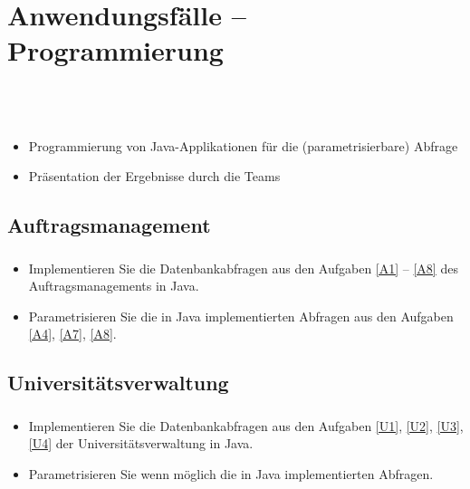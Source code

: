 \section{Anwendungsf\"alle -- Programmierung}

\begin{frame}[t]
\frametitle{\insertsection}
\\[4pt]
\\[8pt]
\begin{itemize}
	\item Programmierung von Java-Applikationen f\"ur die (parametrisierbare) Abfrage
	\item Pr\"asentation der Ergebnisse durch die Teams
\end{itemize}
\end{frame}

\subsection*{Auftragsmanagement}

\begin{frame}[t]
\frametitle{\insertsection}
\framesubtitle{\insertsubsection}
\begin{itemize}
\item Implementieren Sie die Datenbankabfragen aus den Aufgaben \ref{A1} -- \ref{A8} des Auftragsmanagements in Java. 
\item Parametrisieren Sie die in Java implementierten Abfragen aus den Aufgaben \ref{A4}, \ref{A7}, \ref{A8}. 
\end{itemize}
\end{frame}

\subsection*{Universit\"atsverwaltung}

\begin{frame}[t]
\frametitle{\insertsection}
\framesubtitle{\insertsubsection}
\begin{itemize}
	\item Implementieren Sie die Datenbankabfragen aus den Aufgaben \ref{U1}, \ref{U2}, \ref{U3}, \ref{U4} der 
	Universit\"atsverwaltung in Java. 
	\item Parametrisieren Sie wenn m\"oglich die in Java implementierten Abfragen. 
	\end{itemize}
\end{frame}
